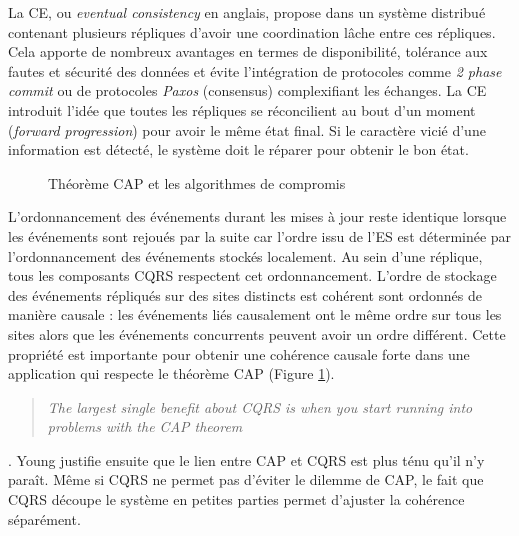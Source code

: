 La \gls{CE}, ou \textit{eventual consistency} en anglais, propose dans un système 
distribué contenant plusieurs répliques d'avoir une coordination lâche entre ces 
répliques. Cela apporte de nombreux avantages en termes de disponibilité, 
tolérance aux fautes et sécurité des données et évite l'intégration de protocoles comme \textit{2 
phase commit} ou de protocoles \textit{Paxos} (consensus) complexifiant les échanges. 
La \gls{CE} introduit l'idée que toutes les répliques se réconcilient au bout d'un 
moment (\textit{forward progression}) pour avoir le même état final. Si le caractère 
vicié d'une information est détecté, le système doit le \og réparer\fg{} pour obtenir 
le bon état. 
\begin{figure} [ht]
	\centering
	\caption{Théorème CAP et les algorithmes de compromis}
	\label{fig:cap}
\end{figure}
L'ordonnancement des événements durant les mises à jour reste identique lorsque
les événements sont rejoués par la suite car l'ordre issu de l'\gls{ES} est 
déterminée par l'ordonnancement des événements stockés 
localement. Au sein d'une réplique, tous les composants \gls{CQRS} respectent 
cet ordonnancement. L’ordre de stockage des événements répliqués sur des sites 
distincts est cohérent sont ordonnés de manière causale \cite{Lamport1978} : les 
événements liés causalement ont le même ordre sur tous les sites alors que les 
événements concurrents peuvent avoir un ordre différent. Cette propriété est 
importante pour obtenir une cohérence causale forte dans une application qui 
respecte le théorème \gls{CAP} (Figure \ref{fig:cap}).  \blockquote[]{	\textit{The 
largest single 
benefit about 
CQRS is when 
		you start running into 
		problems 
		with the CAP theorem}}{
	\cite{Young2010}
}.
Young justifie ensuite que le lien entre \gls{CAP} et \gls{CQRS} est plus ténu qu'il 
n'y paraît. Même si \gls{CQRS} ne permet pas d'éviter le dilemme de \gls{CAP}, le 
fait que \gls{CQRS} découpe le système en petites parties permet d'ajuster la 
cohérence séparément.

